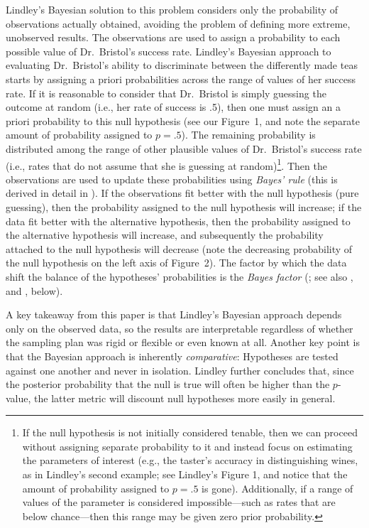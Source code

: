 Lindley's Bayesian solution to this problem considers only the probability of observations actually obtained, avoiding the problem of defining more extreme, unobserved results. The observations are used to assign a probability to each possible value of Dr.\ Bristol's success rate. Lindley's Bayesian approach to evaluating Dr.\ Bristol's ability to discriminate between the differently made teas starts by assigning a priori probabilities across the range of values of her success rate. If it is reasonable to consider that Dr.\ Bristol is simply guessing the outcome at random (i.e., her rate of success is .5), then one must assign an a priori probability to this null hypothesis (see our Figure~1, and note the separate amount of probability assigned to $p=.5$). 
The remaining probability is distributed among the range of other plausible values of Dr.\ Bristol's success rate (i.e., rates that do not assume that she is guessing at random)\footnote{If the null hypothesis is not initially considered tenable, then we can proceed without assigning separate probability to it and instead focus on estimating the parameters of interest (e.g., the taster's accuracy in distinguishing wines, as in Lindley's second example; see Lindley's Figure 1, and notice that the amount of probability assigned to $p=.5$ is gone). Additionally, if a range of values of the parameter is considered impossible---such as rates that are below chance---then this range may be given zero prior probability.}. 
Then the observations are used to update these probabilities using \textit{Bayes' rule} (this is derived in detail in ). If the observations fit better with the null hypothesis (pure guessing), then the probability assigned to the null hypothesis will increase; if the data fit better with the alternative hypothesis, then the probability assigned to the alternative hypothesis will increase, and subsequently the probability attached to the null hypothesis will decrease (note the decreasing probability of the null hypothesis on the left axis of Figure~2). The factor by which the data shift the balance of the hypotheses' probabilities is the \textit{Bayes factor} (; see also , and , below). 

A key takeaway from this paper is that Lindley's Bayesian approach depends only on the observed data, so the results are interpretable regardless of whether the sampling plan was rigid or flexible or even known at all. Another key point is that the Bayesian approach is inherently \textit{comparative}: Hypotheses are tested against one another and never in isolation. Lindley further concludes that, since the posterior probability that the null is true will often be higher than the $p$-value, the latter metric will discount null hypotheses more easily in general.

